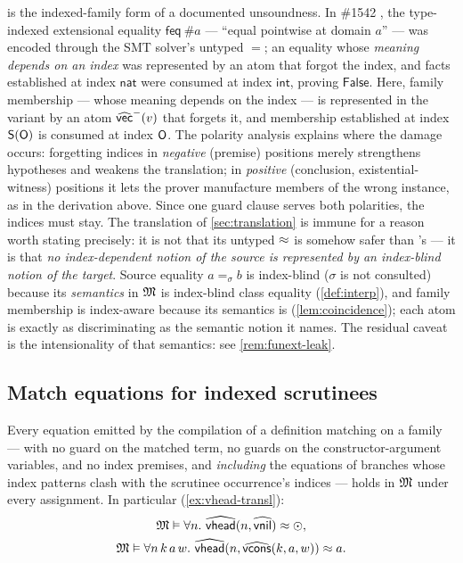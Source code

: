 \begin{remark}
\label{rem:1542}
 is the indexed-family form of a documented
unsoundness.  In \fstar{} \#1542 \cite{FStar1542}, the type-indexed
extensional equality $\mathsf{feq}\ \#a$ --- ``equal pointwise at domain
$a$'' --- was encoded through the SMT solver's untyped $=$; an equality
whose \emph{meaning depends on an index} was represented by an atom that
forgot the index, and facts established at index $\mathsf{nat}$ were
consumed at index $\mathsf{int}$, proving $\mathsf{False}$.  Here,
family membership --- whose meaning depends on the index --- is
represented in the variant by an atom $\widehat{\mathsf{vec}}^-(v)$ that forgets
it, and membership established at index $\mathsf{S}(\mathsf{O})$ is consumed at
index $\mathsf{O}$.  The polarity analysis explains where the damage occurs:
forgetting indices in \emph{negative} (premise) positions merely
strengthens hypotheses and weakens the translation; in \emph{positive}
(conclusion, existential-witness) positions it lets the prover
manufacture members of the wrong instance, as in the derivation above.
Since one guard clause serves both polarities, the indices must stay.
The translation of \cref{sec:translation} is immune for a reason worth
stating precisely: it is not that its untyped $\approx$ is somehow safer
than \fstar{}'s --- it is that \emph{no index-dependent notion of the
source is represented by an index-blind notion of the target}.  Source
equality $a =_\sigma b$ is index-blind ($\sigma$ is not consulted)
because its \emph{semantics} in $\mathfrak{M}$ is index-blind class equality
(\cref{def:interp}), and family membership is index-aware because its
semantics is (\cref{lem:coincidence}); each atom is exactly as
discriminating as the semantic notion it names.  The residual caveat is
the intensionality of that semantics: see \cref{rem:funext-leak}.
\end{remark}

\subsection{Match equations for indexed scrutinees}
\label{sec:formulas-equations}

\begin{proposition}
\label{prop:match-equations}
Every equation emitted by the compilation of a definition matching on a
family --- with no guard on the matched term, no guards on the
constructor-argument variables, and no index premises, and
\emph{including} the equations of branches whose index patterns clash
with the scrutinee occurrence's indices --- holds in $\mathfrak{M}$ under every
assignment.  In particular (\cref{ex:vhead-transl}):
\begin{gather*}
  \mathfrak{M} \vDash \forall n.\ \widehat{\mathsf{vhead}}(n, \widehat{\mathsf{vnil}}) \approx
  \odot,\\
  \mathfrak{M} \vDash \forall n\,k\,a\,w.\
  \widehat{\mathsf{vhead}}(n, \widehat{\mathsf{vcons}}(k,a,w)) \approx a .
\end{gather*}
\end{proposition}

